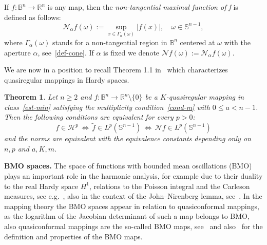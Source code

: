 \documentclass[11pt,a4paper,reqno]{amsart}
\newtheorem{theorem}{Theorem}[section]
\theoremstyle{definition}
\newcommand{\om}{\omega}
\newcommand{\B}{\mathbb{B}^n}
\newcommand{\Nm}{\mathcal{N}}
\newcommand{\Rn}{{\mathbb R}^n}
\newcommand{\Sn}{\mathbb{S}^{n-1}}
\numberwithin{komcounter}{section}
\begin{document}
 If $f:\B\to \Rn$ is any map, then the \emph{non-tangential maximal function of f} is defined as follows:
\[
\Nm_{\alpha} f (\om):= \sup_{x\in \Gamma_{\alpha} (\om)} |f(x)|,\quad \om\in \Sn,
\]
where $\Gamma_\alpha(\om)$ stands for a non-tangential region in $\B$ centered at $\om$ with the aperture $\alpha$, see~\eqref{def-cone}. If $\alpha$ is fixed we denote $\Nm f (\om):=\Nm_{\alpha} f (\om)$.

We are now in a position to recall Theorem 1.1 in~\cite{ag2} which characterizes quasiregular mappings in Hardy spaces.

\begin{theorem}\label{thm11-ag2}
	Let $n \geq 2$ and $f:\B\to \Rn \setminus \{0\}$ be a $K$-quasiregular mapping in class~\eqref{est-min} satisfying the multiplicity condition~\eqref{cond-m} with $0\leq a<n-1$. Then the following conditions are equivalent for every $p>0$:
\[
  f\in \mathcal{H}^p\, \Leftrightarrow\, \tilde{f}\in L^p(\mathbb{S}^{n-1})\,\Leftrightarrow\, \Nm f\in L^p(\mathbb{S}^{n-1})
\]	
and the norms are equivalent with the equivalence constants depending only on $n, p$ and $a, K, m$.
\end{theorem}
\smallskip

{\bf BMO spaces.} The space of functions with bounded mean oscillations (BMO) plays an important role in the harmonic analysis, for example due to their duality to the real Hardy space $H^1$, relations to the Poisson integral and the Carleson measures, see e.g.~\cite[Chapter VI]{g}, also in the context of the John--Nirenberg lemma, see~\cite[Chapter 18]{hkm}. In the mapping theory the BMO spaces appear in relation to quasiconformal mappings, as the logarithm of the Jacobian determinant of such a map belongs to BMO, also quasiconformal mappings are the so-called BMO maps, see~\cite{rei74, rr} and also~\cite{go, kkms, j} for the definition and properties of the BMO maps.
\end{document}

